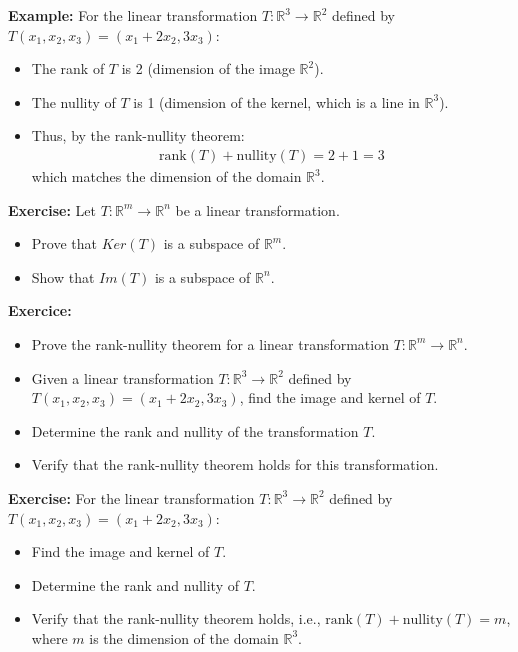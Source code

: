 \begin{frame}
    \textbf{Example:} For the linear transformation $T:\mathbb{R}^3 \rightarrow \mathbb{R}^2$ defined by $T(x_1, x_2, x_3) = (x_1 + 2x_2, 3x_3)$:
    \begin{itemize}
        \item The rank of $T$ is 2 (dimension of the image $\mathbb{R}^2$).
        \item The nullity of $T$ is 1 (dimension of the kernel, which is a line in $\mathbb{R}^3$).
        \item Thus, by the rank-nullity theorem:
        \begin{align*}
            \text{rank}(T) + \text{nullity}(T) = 2 + 1 = 3
        \end{align*}
        which matches the dimension of the domain $\mathbb{R}^3$.
    \end{itemize}
\end{frame}

\begin{frame}
    \textbf{Exercise:} Let $T:\mathbb{R}^m \rightarrow \mathbb{R}^n$ be a linear transformation.
    \begin{itemize}
        \item Prove that $Ker(T)$ is a subspace of $\mathbb{R}^m$.
        \item Show that $Im(T)$  is a subspace of  $\mathbb{R}^n$.
    \end{itemize} 
    \textbf{Exercice:} 
    \begin{itemize}
        \item Prove the rank-nullity theorem for a linear transformation $T:\mathbb{R}^m \rightarrow \mathbb{R}^n$.
        \item Given a linear transformation $T:\mathbb{R}^3 \rightarrow \mathbb{R}^2$ defined by $T(x_1, x_2, x_3) = (x_1 + 2x_2, 3x_3)$, find the image and kernel of $T$.
        \item Determine the rank and nullity of the transformation $T$.
        \item Verify that the rank-nullity theorem holds for this transformation.
    \end{itemize}
  
\end{frame}
\begin{frame}
    \textbf{Exercise:} For the linear transformation $T:\mathbb{R}^3 \rightarrow \mathbb{R}^2$ defined by $T(x_1, x_2, x_3) = (x_1 + 2x_2, 3x_3)$:
    \begin{itemize}
        \item Find the image and kernel of $T$.
        \item Determine the rank and nullity of $T$.
        \item Verify that the rank-nullity theorem holds, i.e., $\text{rank}(T) + \text{nullity}(T) = m$, where $m$ is the dimension of the domain $\mathbb{R}^3$.
    \end{itemize}
\end{frame}



